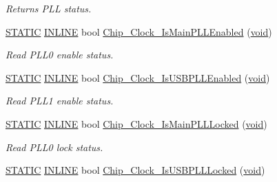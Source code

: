 \begin{DoxyCompactItemize}
\begin{DoxyCompactList}\small\item\em Returns P\-L\-L status. \end{DoxyCompactList}\item 
\hyperlink{group__LPC__Types__Public__Macros_ga10b2d890d871e1489bb02b7e70d9bdfb}{S\-T\-A\-T\-I\-C} \hyperlink{group__LPC__Types__Public__Types_ga2eb6f9e0395b47b8d5e3eeae4fe0c116}{I\-N\-L\-I\-N\-E} bool \hyperlink{group__CLOCK__17XX__40XX_ga63e9e5918d1a8b0d1c5811c3f0189846}{Chip\-\_\-\-Clock\-\_\-\-Is\-Main\-P\-L\-L\-Enabled} (\hyperlink{Paradigm_2Tern__EE_2small_2portmacro_8h_a14d32f8130d3c0b212cfc751730b5b49}{void})
\begin{DoxyCompactList}\small\item\em Read P\-L\-L0 enable status. \end{DoxyCompactList}\item 
\hyperlink{group__LPC__Types__Public__Macros_ga10b2d890d871e1489bb02b7e70d9bdfb}{S\-T\-A\-T\-I\-C} \hyperlink{group__LPC__Types__Public__Types_ga2eb6f9e0395b47b8d5e3eeae4fe0c116}{I\-N\-L\-I\-N\-E} bool \hyperlink{group__CLOCK__17XX__40XX_ga0915951815b5bd5e32b7220784a96032}{Chip\-\_\-\-Clock\-\_\-\-Is\-U\-S\-B\-P\-L\-L\-Enabled} (\hyperlink{Paradigm_2Tern__EE_2small_2portmacro_8h_a14d32f8130d3c0b212cfc751730b5b49}{void})
\begin{DoxyCompactList}\small\item\em Read P\-L\-L1 enable status. \end{DoxyCompactList}\item 
\hyperlink{group__LPC__Types__Public__Macros_ga10b2d890d871e1489bb02b7e70d9bdfb}{S\-T\-A\-T\-I\-C} \hyperlink{group__LPC__Types__Public__Types_ga2eb6f9e0395b47b8d5e3eeae4fe0c116}{I\-N\-L\-I\-N\-E} bool \hyperlink{group__CLOCK__17XX__40XX_gaaa21bfa511cd25dc4f4394709dc58ced}{Chip\-\_\-\-Clock\-\_\-\-Is\-Main\-P\-L\-L\-Locked} (\hyperlink{Paradigm_2Tern__EE_2small_2portmacro_8h_a14d32f8130d3c0b212cfc751730b5b49}{void})
\begin{DoxyCompactList}\small\item\em Read P\-L\-L0 lock status. \end{DoxyCompactList}\item 
\hyperlink{group__LPC__Types__Public__Macros_ga10b2d890d871e1489bb02b7e70d9bdfb}{S\-T\-A\-T\-I\-C} \hyperlink{group__LPC__Types__Public__Types_ga2eb6f9e0395b47b8d5e3eeae4fe0c116}{I\-N\-L\-I\-N\-E} bool \hyperlink{group__CLOCK__17XX__40XX_gae0a614530296b96ef560bd2986277c3e}{Chip\-\_\-\-Clock\-\_\-\-Is\-U\-S\-B\-P\-L\-L\-Locked} (\hyperlink{Paradigm_2Tern__EE_2small_2portmacro_8h_a14d32f8130d3c0b212cfc751730b5b49}{void})

\end{DoxyCompactItemize}
